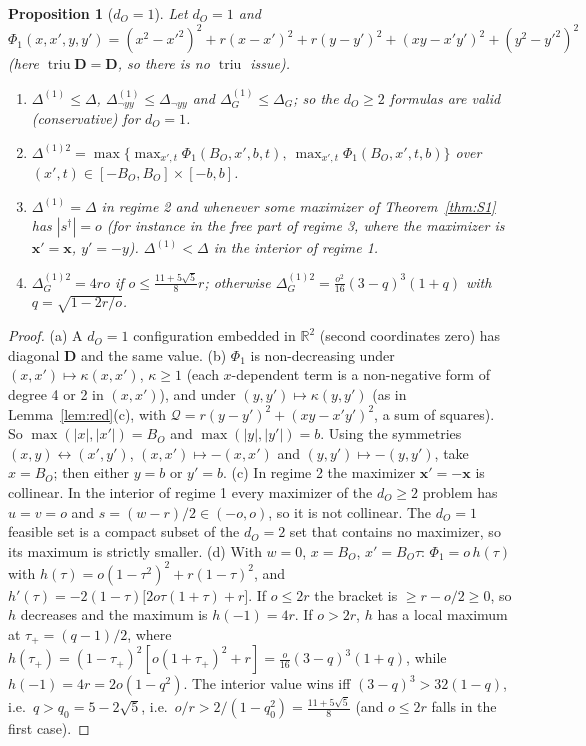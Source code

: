 \documentclass[11pt]{article}
\theoremstyle{definition}
\theoremstyle{plain}
\newtheorem{proposition}[definition]{Proposition}
\newcommand{\bx}{\mathbf{x}}
\DeclareMathOperator{\triu}{triu}
\newcommand{\R}{\mathbb{R}}
\newcommand{\bD}{\mathbf{D}}
\begin{document}
\begin{proposition}[$d_O=1$]\label{prop:dO1}
Let $d_O=1$ and $\Phi_1(x,x',y,y')=(x^2-x'^2)^2+r(x-x')^2+r(y-y')^2+(xy-x'y')^2+(y^2-y'^2)^2$ (here $\triu\bD=\bD$, so there is no $\triu$ issue).
\begin{enumerate}[label=(\alph*),nosep]
  \item $\Delta^{(1)}\le\Delta$, $\Delta^{(1)}_{\neg yy}\le\Delta_{\neg yy}$ and $\Delta^{(1)}_G\le\Delta_G$; so the $d_O\ge2$ formulas are valid (conservative) for $d_O=1$.
  \item $\Delta^{(1)2}=\max\bigl\{\max_{x',t}\Phi_1(B_O,x',b,t),\ \max_{x',t}\Phi_1(B_O,x',t,b)\bigr\}$ over $(x',t)\in[-B_O,B_O]\times[-b,b]$.
  \item $\Delta^{(1)}=\Delta$ in regime 2 and whenever some maximizer of Theorem~\ref{thm:S1} has $|s^\dagger|=o$ (for instance in the free part of regime 3, where the maximizer is $\bx'=\bx$, $y'=-y$). $\Delta^{(1)}<\Delta$ in the interior of regime 1.
  \item $\Delta_G^{(1)2}=4ro$ if $o\le\frac{11+5\sqrt5}{8}r$; otherwise $\Delta_G^{(1)2}=\frac{o^2}{16}(3-q)^3(1+q)$ with $q=\sqrt{1-2r/o}$.
\end{enumerate}
\end{proposition}
\begin{proof}
(a) A $d_O=1$ configuration embedded in $\R^2$ (second coordinates zero) has diagonal $\bD$ and the same value. (b) $\Phi_1$ is non-decreasing under $(x,x')\mapsto\kappa(x,x')$, $\kappa\ge1$ (each $x$-dependent term is a non-negative form of degree 4 or 2 in $(x,x')$), and under $(y,y')\mapsto\kappa(y,y')$ (as in Lemma~\ref{lem:red}(c), with $\mathcal Q=r(y-y')^2+(xy-x'y')^2$, a sum of squares). So $\max(|x|,|x'|)=B_O$ and $\max(|y|,|y'|)=b$. Using the symmetries $(x,y)\leftrightarrow(x',y')$, $(x,x')\mapsto-(x,x')$ and $(y,y')\mapsto-(y,y')$, take $x=B_O$; then either $y=b$ or $y'=b$. (c) In regime 2 the maximizer $\bx'=-\bx$ is collinear. In the interior of regime 1 every maximizer of the $d_O\ge2$ problem has $u=v=o$ and $s=(w-r)/2\in(-o,o)$, so it is not collinear. The $d_O=1$ feasible set is a compact subset of the $d_O=2$ set that contains no maximizer, so its maximum is strictly smaller. (d) With $w=0$, $x=B_O$, $x'=B_O\tau$: $\Phi_1=o\,h(\tau)$ with $h(\tau)=o(1-\tau^2)^2+r(1-\tau)^2$, and $h'(\tau)=-2(1-\tau)\bigl[2o\tau(1+\tau)+r\bigr]$. If $o\le2r$ the bracket is $\ge r-o/2\ge0$, so $h$ decreases and the maximum is $h(-1)=4r$. If $o>2r$, $h$ has a local maximum at $\tau_+=(q-1)/2$, where $h(\tau_+)=(1-\tau_+)^2[o(1+\tau_+)^2+r]=\frac o{16}(3-q)^3(1+q)$, while $h(-1)=4r=2o(1-q^2)$. The interior value wins iff $(3-q)^3>32(1-q)$, i.e.\ $q>q_0=5-2\sqrt5$, i.e.\ $o/r>2/(1-q_0^2)=\frac{11+5\sqrt5}{8}$ (and $o\le2r$ falls in the first case).
\end{proof}
\end{document}
